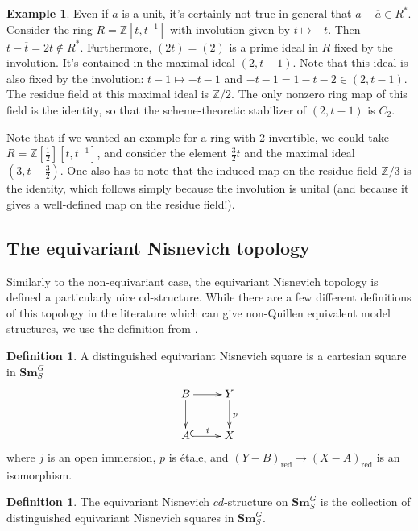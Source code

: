 \documentclass[draftthesis,tocnosub,noragright,centerchapter,10pt]{uiucthesis2009}
\newcommand{\Z}{\mathbb Z}
\newcommand{\Sm}[1]{\mathbf{Sm}_{#1}}
\theoremstyle{plain}
\theoremstyle{definition}
\newtheorem{example}[lemma]{Example}
\newtheorem{definition}[lemma]{Definition}
\begin{document}
\begin{example}
Even if $a$ is a unit, it's certainly not true in general that
$ a - \overline a \in R^*$. Consider the ring $R = \Z[t,t^{-1}]$ with
involution given by $t \mapsto -t$. Then $t - \overline t = 2t \not
\in R^*$. Furthermore, $(2t) = (2)$ is a prime ideal in $R$ fixed by
the involution. It's contained in the maximal ideal $(2,t-1)$. Note
that this ideal is also fixed by the involution: $t - 1 \mapsto -t-1$
and $-t-1 = 1-t -2 \in (2,t-1)$. The residue field at this maximal
ideal is $\Z/2$. The only nonzero ring map of this field is the
identity, so that the scheme-theoretic stabilizer of $(2,t-1)$ is
$C_2$.

Note that if we wanted an example for a ring with 2 invertible, we
could take $R=\Z[\frac{1}{2}][t,t^{-1}]$, and consider the element
$\frac{3}{2}t$ and the maximal ideal $(3,t-\frac{3}{2})$. One also has
to note that the induced map on the residue field $\Z/3$ is the
identity, which follows simply because the involution is unital (and
because it gives a well-defined map on the residue field!).
\end{example}

\subsection{The equivariant Nisnevich topology}

Similarly to the non-equivariant case, the equivariant Nisnevich
topology is defined a particularly nice cd-structure. While there are
a few different definitions of this topology in the literature which
can give non-Quillen equivalent model structures, we use the
definition from \cite{GrpSchHell}.



\begin{definition}
A distinguished equivariant Nisnevich square is a cartesian square in
$\Sm{S}^G$
\[
\xymatrix{B \ar[r]\ar[d] & Y \ar[d]^p \\ A \ar@{^{(}->}[r]^i & X}
\]
where $j$ is an open immersion, $p$ is \'etale, and
$(Y-B)_{\mathrm{red}} \rightarrow (X-A)_{\mathrm{red}}$ is an
isomorphism. 
\end{definition}

\begin{definition}
The equivariant Nisnevich $cd$-structure on $\Sm{S}^G$ is the
collection of distinguished equivariant Nisnevich squares in $\Sm{S}^G$.
\end{definition}
\end{document}
